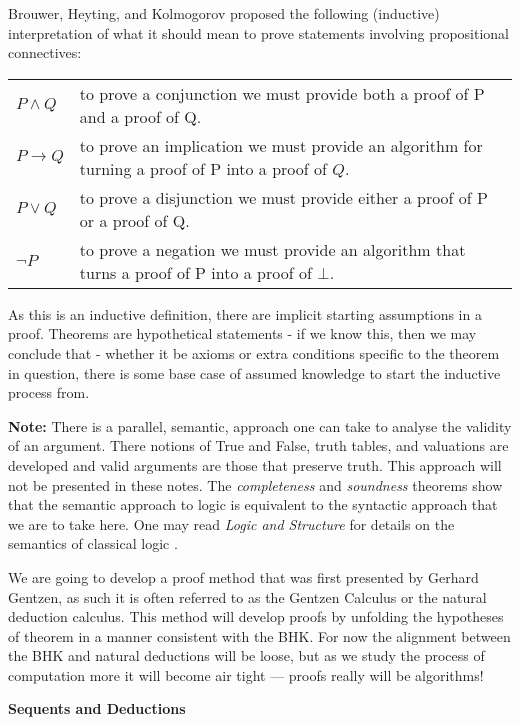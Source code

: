 \documentclass{book}
\begin{document}
    Brouwer, Heyting, and Kolmogorov proposed the following (inductive) interpretation of what it should mean to prove statements involving propositional connectives:
  
    \begin{center}
      \begin{tabular}{p{1.5cm}p{8cm}}
        $P \land Q$ & to prove a conjunction we must provide both a proof of P and a proof of Q. \\      
        $P \to Q$ & to prove an implication we must provide an algorithm for turning a proof of P into a proof of $Q$.\\
        $P \lor Q$ & to prove a disjunction we must provide either a proof of P or a proof of Q. \\
        $\lnot P$ &  to prove a negation we must provide an algorithm that turns a proof of P into a proof of $\bot$.
      \end{tabular}
    \end{center}

    As this is an inductive definition, there are implicit starting assumptions in a proof. Theorems are hypothetical statements - if we know this, then we may conclude that - whether it be axioms or extra conditions specific to the theorem in question, there is some base case of assumed knowledge to start the inductive process from. 

    {\bf Note:} There is a parallel, semantic, approach one can take to analyse the validity of an argument. There notions of True and False, truth tables, and valuations are developed and valid arguments are those that preserve truth. This approach will not be presented in these notes. The \emph{completeness} and \emph{soundness} theorems show that the semantic approach to logic is equivalent to the syntactic approach that we are to take here. One may read \emph{Logic and Structure} for details on the semantics of classical logic \cite{vDalen}.

    We are going to develop a proof method that was first presented by Gerhard Gentzen, as such it is often referred to as the Gentzen Calculus or the natural deduction calculus. This method will develop proofs by unfolding the hypotheses of theorem in a manner consistent with the BHK. For now the alignment between the BHK and natural deductions will be loose, but as we study the process of computation more it will become air tight --- proofs really will be algorithms! 

    \begin{center}
        {\bf Sequents and Deductions}
    \end{center}
\end{document}
